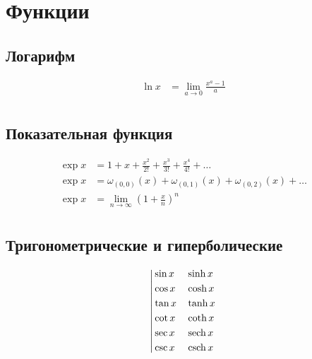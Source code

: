 
\section{Функции}

\subsection{Логарифм}

\begin{equation*} \begin{aligned}
\ln{x} &= \lim_{a \to 0} \frac{x^a - 1}{a} \\
\end{aligned} \end{equation*}

\subsection{Показательная функция}

\begin{equation*}
\begin{aligned}
\exp{x} &= 
  1
+ x
+ \frac{x^2}{2!}
+ \frac{x^3}{3!}
+ \frac{x^4}{4!}
+ \ldots
\\
\exp{x} &=
  \omega_{(0,0)}(x)
+ \omega_{(0,1)}(x)
+ \omega_{(0,2)}(x)
+ \ldots
\\
\exp{x} &=
  \lim_{n \to \infty} \left(
  1 + \frac{x}{n}
  \right)^n
\\
\end{aligned}
\end{equation*}

\subsection{Тригонометрические и гиперболические} %

\begin{equation*}
\left|
\begin{aligned}
&\sin{x} & &\sinh{x} \\
&\cos{x} & &\cosh{x} \\
&\tan{x} & &\tanh{x} \\
&\cot{x} & &\coth{x} \\
&\sec{x} & &\operatorname{sech}{x} \\
&\csc{x} & &\operatorname{csch}{x} \\
\end{aligned}
\right.
\end{equation*}

